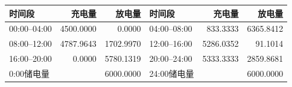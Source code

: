 \begin{tabular}{lrr lrr}
\toprule
时间段 & 充电量 & 放电量 & 时间段 & 充电量 & 放电量 \\
\midrule
00:00--04:00 & 4500.0000 & 0.0000 & 04:00--08:00 & 833.3333 & 6365.8412 \\
08:00--12:00 & 4787.9643 & 1702.9970 & 12:00--16:00 & 5286.0352 & 91.1014 \\
16:00--20:00 & 0.0000 & 5780.1319 & 20:00--24:00 & 5333.3333 & 2859.8681 \\
\midrule
0:00储电量 & \multicolumn{2}{r}{6000.0000} & 24:00储电量 & \multicolumn{2}{r}{6000.0000} \\
\bottomrule
\end{tabular}